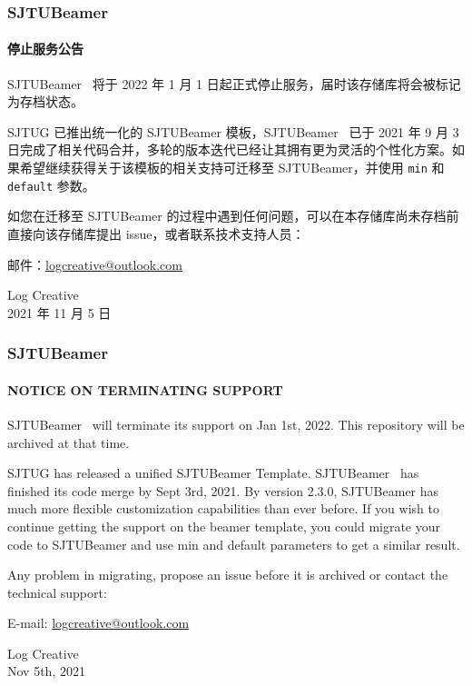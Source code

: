 \documentclass[aspectratio=169]{beamer}
\def\themename{SJTUBeamer \fbox{\scshape min}}
\begin{document}
    \begin{frame}
        \frametitle{\themename\ }
        \framesubtitle{停止服务公告}
        
        \themename\ 将于 2022 年 1 月 1 日起正式停止服务，届时该存储库将会被标记为存档状态。

        SJTUG 已推出统一化的 SJTUBeamer 模板，\themename\ 已于 2021 年 9 月 3 日完成了相关代码合并，多轮的版本迭代已经让其拥有更为灵活的个性化方案。如果希望继续获得关于该模板的相关支持可迁移至 SJTUBeamer，并使用 \texttt{min} 和 \texttt{default} 参数。

        如您在迁移至 SJTUBeamer 的过程中遇到任何问题，可以在本存储库尚未存档前直接向该存储库提出 issue，或者联系技术支持人员：

        邮件：\href{malito:logcreative@outlook.com}{\ttfamily logcreative@outlook.com}

        Log Creative\\
        2021 年 11 月 5 日
    \end{frame}
    \begin{frame}
        \frametitle{\themename\ }
        \framesubtitle{NOTICE ON TERMINATING SUPPORT}
        
        \themename\ will terminate its support on Jan 1st, 2022. This repository will be archived at that time.

        SJTUG has released a unified SJTUBeamer Template. \themename\ has finished its code merge by Sept 3rd, 2021. By version 2.3.0, SJTUBeamer has much more flexible customization capabilities than ever before. If you wish to continue getting the support on the beamer template, you could migrate your code to SJTUBeamer and use min and default parameters to get a similar result.

        Any problem in migrating, propose an issue before it is archived or contact the technical support:

        E-mail: \href{malito:logcreative@outlook.com}{\ttfamily logcreative@outlook.com}

        Log Creative\\
        Nov 5th, 2021
    \end{frame}
\end{document}
